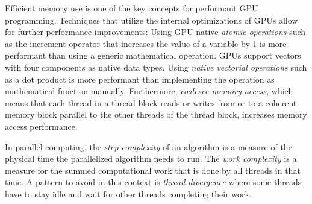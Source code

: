 Efficient memory use is one of the key concepts for performant GPU programming. Techniques that utilize the internal optimizations of GPUs allow for further performance improvements: Using GPU-native \textit{atomic operations} such as the increment operator that increases the value of a variable by 1 is more performant than using a generic mathematical operation. GPUs support vectors with four components as native data types. Using \textit{native vectorial operations} such as a dot product is more performant than implementing the operation as mathematical function manually. Furthermore, \textit{coalesce memory access}, which means that each thread in a thread block reads or writes from or to a coherent memory block parallel to the other threads of the thread block, increases memory access performance. \cite{cudacourse}

In parallel computing, the \textit{step complexity} of an algorithm is a measure of the physical time the parallelized algorithm needs to run. The \textit{work complexity} is a measure for the summed computational work that is done by all threads in that time. A pattern to avoid in this context is \textit{thread divergence} where some threads have to stay idle and wait for other threads completing their work. \cite{cudacourse}
